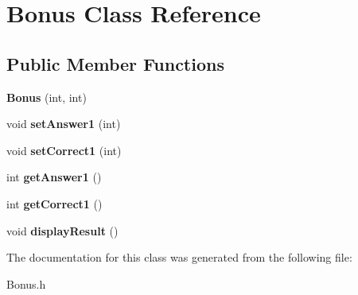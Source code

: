 \hypertarget{class_bonus}{\section{Bonus Class Reference}
\label{class_bonus}
}
\subsection*{Public Member Functions}
\begin{DoxyCompactItemize}
\item 
\hypertarget{class_bonus_a7880a9578badb157da5a12ef2915b0fd}{{\bfseries Bonus} (int, int)}\label{class_bonus_a7880a9578badb157da5a12ef2915b0fd}

\item 
\hypertarget{class_bonus_a916fa2a53339bfc7b8db1093bcdd67ea}{void {\bfseries set\+Answer1} (int)}\label{class_bonus_a916fa2a53339bfc7b8db1093bcdd67ea}

\item 
\hypertarget{class_bonus_ae7971ce9358d404bc5b50e649e15d0be}{void {\bfseries set\+Correct1} (int)}\label{class_bonus_ae7971ce9358d404bc5b50e649e15d0be}

\item 
\hypertarget{class_bonus_a58895ac9f4e4607feb32f12334ce5d3a}{int {\bfseries get\+Answer1} ()}\label{class_bonus_a58895ac9f4e4607feb32f12334ce5d3a}

\item 
\hypertarget{class_bonus_a7fb014adc2258f97331292fec0ce9109}{int {\bfseries get\+Correct1} ()}\label{class_bonus_a7fb014adc2258f97331292fec0ce9109}

\item 
\hypertarget{class_bonus_a1271c1690155e63b9b97182eac0aea8e}{void {\bfseries display\+Result} ()}\label{class_bonus_a1271c1690155e63b9b97182eac0aea8e}

\end{DoxyCompactItemize}


The documentation for this class was generated from the following file\+:\begin{DoxyCompactItemize}
\item 
Bonus.\+h\end{DoxyCompactItemize}
